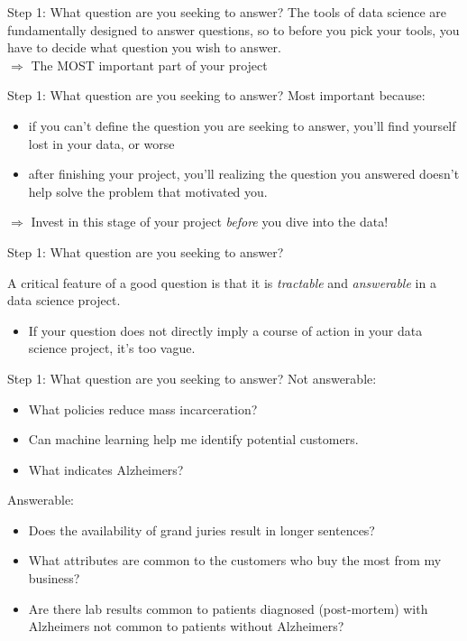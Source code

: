 \documentclass[11pt]{beamer}
\begin{document}
\begin{frame}[c]{Step 1: What \alert{question} are you seeking to answer?}
The tools of data science are fundamentally designed to \alert{answer questions}, \pause so to before you pick your tools, you have to decide \alert{what question you wish to answer.}\\
\vspace*{0.1cm}
\pause $\Rightarrow$ The MOST important part of your project\\
\end{frame}

\begin{frame}[c]{Step 1: What \alert{question} are you seeking to answer?}
Most important because:

\begin{itemize}
  \pause \item if you can't define the question you are seeking to answer, \alert{you'll find yourself lost in your data}, or worse
  \pause \item after finishing your project, you'll realizing the question you answered doesn't help solve the problem that motivated you.
\end{itemize}
\pause  $\Rightarrow$ Invest in this stage of your project \emph{before} you dive into the data!
\end{frame}


\begin{frame}[c]{Step 1: What \alert{question} are you seeking to answer?}

A critical feature of a good question is that it is \emph{tractable} and \emph{answerable} in a data science project. \\
\begin{itemize}
  \item If your question does not directly imply a course of action in your data science project, it's too vague.
\end{itemize}
\end{frame}

\begin{frame}[c]{Step 1: What \alert{question} are you seeking to answer?}
Not answerable:
\begin{itemize}
  \item What policies reduce mass incarceration?
  \item Can machine learning help me identify potential customers.
  \item What indicates Alzheimers?
\end{itemize}
\pause
Answerable:
\begin{itemize}
  \item Does the availability of grand juries result in longer sentences?
  \item What attributes are common to the customers who buy the most from my business?
  \item Are there lab results common to patients diagnosed (post-mortem) with Alzheimers not common to patients without Alzheimers?
\end{itemize}
\end{frame}
\end{document}
